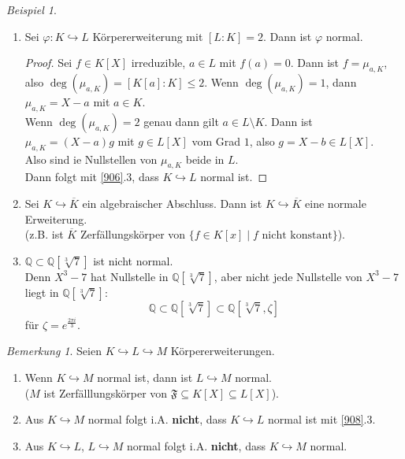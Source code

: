 \documentclass[10pt,a4paper]{article}
\newcommand{\Q}{\ensuremath{\mathbb{Q}}}
\newcommand{\ol}[1]{\overline{#1}}
\newcounter{thm}[section]
\theoremstyle{definition}
\theoremstyle{plain}
\theoremstyle{remark}
\newtheorem{bem}[thm]{Bemerkung}
\newtheorem{exm}[thm]{Beispiel}
\begin{document}
\begin{exm}
	\begin{enumerate}
		\item Sei $\varphi:K\hookrightarrow L$ Körpererweiterung mit $[L:K]=2$. Dann ist $\varphi$ normal.
		\begin{proof}
			Sei $f\in K[X]$ irreduzible, $a\in L$ mit $f(a)=0$. Dann ist $f=\mu_{a,K}$, also $\deg(\mu_{a,K})=[K[a]:K]\leq 2$.
			Wenn $\deg(\mu_{a,K})=1$, dann $\mu_{a,K}=X-a$ mit $a\in K$.\\
			Wenn $\deg(\mu_{a,K})=2$ genau dann gilt $a\in L\setminus K$. Dann ist $\mu_{a,K}=(X-a)g$ mit $g\in L[X]$ vom Grad $1$, also $g=X-b\in L[X]$.\\
			Also sind ie Nullstellen von $\mu_{a,K}$ beide in $L$.\\
			Dann folgt mit \ref{906}.3, dass $K\hookrightarrow L$ normal ist.
		\end{proof}
		\item Sei $K\hookrightarrow \ol K$ ein algebraischer Abschluss. Dann ist $K\hookrightarrow \ol K$ eine normale Erweiterung.\\
		(z.B. ist $\ol K$ Zerfällungskörper von $\{f\in K[x]\mid\text{$f$ nicht konstant}\}$).
		\item $\Q\subset \Q[\sqrt[3]{7}]$ ist nicht normal.\\
		Denn $X^3-7$ hat Nullstelle in $\Q[\sqrt[3]{7}]$, aber nicht jede Nullstelle von $X^3-7$ liegt in $\Q[\sqrt[3]{7}]$:
		\[\Q\subset \Q[\sqrt[3]{7}]\subset \Q[\sqrt[3]{7},\zeta]\]
		für $\zeta=e^{\frac{2\pi i}{3}}$.
	\end{enumerate}
\end{exm}

\begin{bem}
	Seien $K\hookrightarrow L\hookrightarrow M$ Körpererweiterungen.
	\begin{enumerate}
		\item  Wenn $K\hookrightarrow M$ normal ist, dann ist $L\hookrightarrow M$ normal.\\
		($M$ ist Zerfälllungskörper von $\mathfrak F\subseteq K[X]\subseteq L[X]$).
		\item Aus $K\hookrightarrow M$ normal folgt i.A. \textbf{nicht}, dass $K\hookrightarrow L$ normal ist mit \ref{908}.3.
		\item Aus $K\hookrightarrow L$, $L\hookrightarrow M$ normal folgt i.A. \textbf{nicht}, dass $K\hookrightarrow M$ normal.
	\end{enumerate}
\end{bem}
\end{document}
